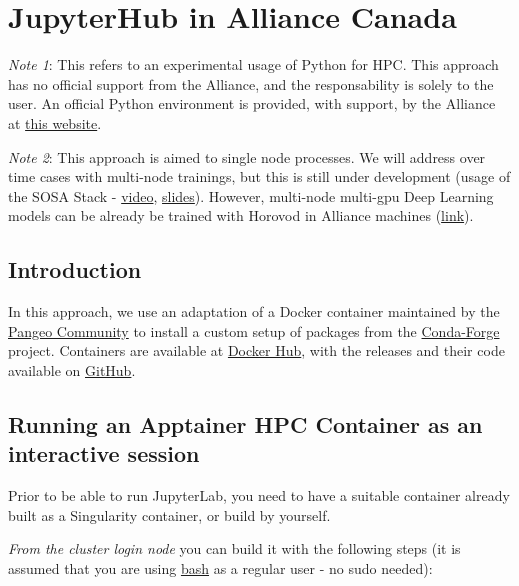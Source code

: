 \documentclass[
]{book}
\begin{document}
\hypertarget{jupyterhub-in-alliance-canada}{%
\chapter{JupyterHub in Alliance Canada}\label{jupyterhub-in-alliance-canada}}

\emph{Note 1}: This refers to an experimental usage of Python for HPC. This approach
has no official support from the Alliance, and the responsability is solely to
the user. An official Python environment is provided, with support, by the Alliance at
\href{https://docs.alliancecan.ca/wiki/Python}{this website}.

\emph{Note 2}: This approach is aimed to single node processes. We will address over time cases with multi-node trainings, but this is still under development (usage of the SOSA Stack - \href{https://youtu.be/2SbpEiOM5JE}{video}, \href{https://zenodo.org/record/7857369}{slides}). However, multi-node multi-gpu Deep Learning models can be already be trained with Horovod in Alliance machines (\href{https://docs.alliancecan.ca/wiki/TensorFlow/en\#Horovod}{link}).

\hypertarget{introduction-2}{%
\section{Introduction}\label{introduction-2}}

In this approach, we use an adaptation of a Docker container maintained by the \href{https://pangeo.io}{Pangeo Community} to install a custom setup of packages from the \href{https://conda-forge.org}{Conda-Forge} project. Containers are available at \href{https://hub.docker.com/repository/docker/ricardobarroslourenco/ts_rs/general}{Docker Hub}, with the releases and their code available on \href{https://github.com/ricardobarroslourenco/rs_images}{GitHub}.

\hypertarget{running-an-apptainer-hpc-container-as-an-interactive-session-1}{%
\section{Running an Apptainer HPC Container as an interactive session}\label{running-an-apptainer-hpc-container-as-an-interactive-session-1}}

Prior to be able to run JupyterLab, you need to have a suitable container already built
as a Singularity container, or build by yourself.

\emph{From the cluster login node} you can build it with the following steps (it is assumed that you are using \href{https://en.wikipedia.org/wiki/Bash_(Unix_shell)}{bash} as a regular user - no sudo needed):
\end{document}
